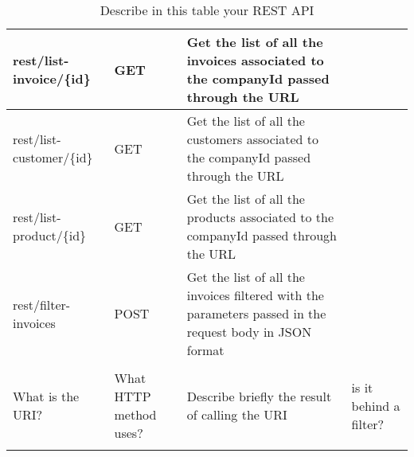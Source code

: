 \begin{longtable}{|p{}|p{} |p{}|p{}|}
rest/list-invoice/\{id\} & GET & Get the list of all the invoices associated to the companyId passed through the URL \\\hline
rest/list-customer/\{id\} & GET & Get the list of all the customers associated to the companyId passed through the URL \\\hline
rest/list-product/\{id\} & GET & Get the list of all the products associated to the companyId passed through the URL \\\hline
rest/filter-invoices & POST & Get the list of all the invoices filtered with the parameters passed in the request body in JSON format \\\hline
\\\hline

What is the URI? & What HTTP method uses? &  Describe briefly the result of calling the URI & is it behind a filter?\\\hline
\caption{Describe in this table your REST API}
\label{tab:termGlossary}
\end{longtable}